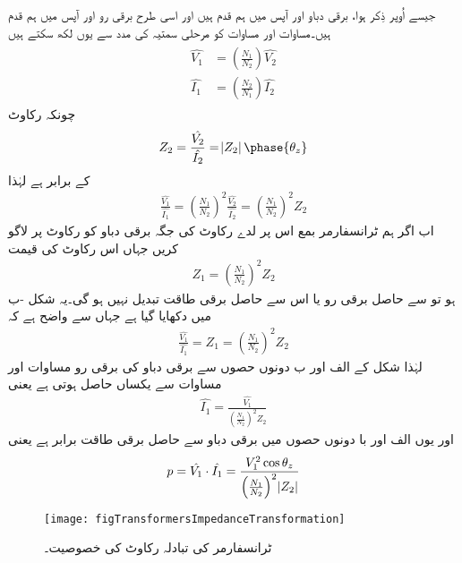 جیسے اُوپر ذِکر ہوا، برقی دباو  اور  آپس میں ہم قدم ہیں اور  اسی طرح برقی رو  اور  آپس میں  ہم قدم ہیں۔مساوات  اور  مساوات    کو مرحلی سمتیہ کی مدد سے یوں لکھ سکتے ہیں
\begin{gather}
\begin{aligned}
\hat{V_1}&=\left(\frac{N_1}{N_2} \right) \hat{V_2}\\
\hat{I_1}&=\left(\frac{N_2}{N_1} \right) \hat{I_2}
\end{aligned}
\end{gather}
چونکہ رکاوٹ
\begin{align}
Z_2=\frac{\hat{V_2}}{\hat{I_2}}=\abs{Z_2}\phase{\theta_z}
\end{align}
کے برابر ہے لہٰذا
\begin{align}\label{مساوات_ٹرانسفارمر_تبادلہ_رکاوٹ_الف}
\frac{\hat{V_1}}{\hat{I_1}}=\left(\frac{N_1}{N_2} \right)^2 \frac{\hat{V_2}}{\hat{I_2}}=\left(\frac{N_1}{N_2} \right)^2  Z_2
\end{align}
اب اگر ہم ٹرانسفارمر بمع اس پر لدے رکاوٹ  کی جگہ برقی دباو  کو رکاوٹ  پر لاگو کریں جہاں اس رکاوٹ کی قیمت
\begin{align}\label{مساوات_ٹرانسفارمر_متبادل_رکاوٹ_تعریف}
Z_1=\left(\frac{N_1}{N_2} \right)^2  Z_2
\end{align}
ہو تو  سے حاصل برقی رو یا اس سے حاصل برقی طاقت تبدیل نہیں ہو گی۔یہ شکل -ب میں دکھایا گیا ہے جہاں سے واضح ہے کہ
\begin{align}\label{مساوات_ٹرانسفارمر_تبادلہ_رکاوٹ_ب}
\frac{\hat{V_1}}{\hat{I_1}}=Z_1=\left(\frac{N_1}{N_2} \right)^2  Z_2
\end{align}
لہٰذا شکل کے الف اور ب دونوں حصوں سے  برقی دباو  کی برقی رو مساوات   اور مساوات   سے یکساں حاصل ہوتی ہے یعنی
\begin{align}
\hat{I_1}=\frac{\hat{V_1}}{\left(\frac{N_1}{N_2} \right)^2  Z_2}
\end{align}
اور یوں الف اور با  دونوں حصوں میں  برقی دباو  سے حاصل برقی طاقت برابر ہے یعنی
\begin{align}
p=\hat{V_1} \cdot \hat{I_1}=\frac{V_1^2 \cos \theta_z}{\left(\frac{N_1}{N_2} \right)^2  \abs{Z_2}}
\end{align}
%
\begin{figure}
\centering
\texttt{[image: figTransformersImpedanceTransformation]}
\caption{ٹرانسفارمر کی تبادلہ رکاوٹ کی خصوصیت۔}
\label{شکل_ٹرانسفارمر_رکاوٹ_کا_تبادلہ}
\end{figure}
